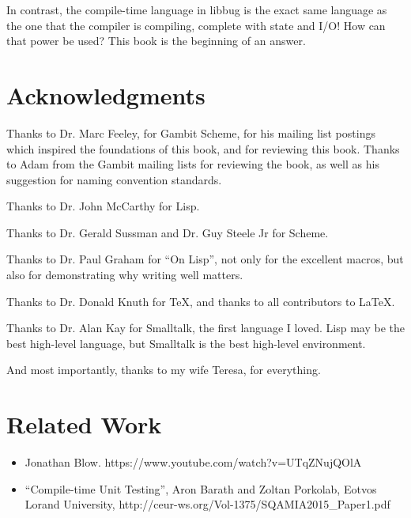  In contrast, the compile-time
 language in libbug is the exact same language as the one that the compiler
 is compiling, complete with state and I/O!  How can that power be used?
 This book is the beginning of an answer.

\chapter{Acknowledgments}

Thanks to Dr. Marc Feeley, for Gambit Scheme, for his mailing list postings
which inspired the foundations of this book, and for reviewing this
book.  Thanks to Adam from the Gambit mailing lists for reviewing the book,
as well as his suggestion for naming convention standards.

Thanks to Dr. John McCarthy for Lisp.

Thanks to Dr. Gerald Sussman and Dr. Guy Steele Jr for Scheme.

Thanks to Dr. Paul Graham for ``On Lisp'', not only for the excellent macros,
but also for demonstrating why writing well matters.

Thanks to Dr. Donald Knuth for \TeX, and thanks to all contributors to
\LaTeX.

Thanks to Dr. Alan Kay for Smalltalk, the first language I loved.  Lisp may be the best high-level language, but Smalltalk is the best high-level environment.

And most importantly, thanks to my wife Teresa, for everything.

\chapter{Related Work}
\begin{itemize}
        \item  Jonathan Blow. https://www.youtube.com/watch?v=UTqZNujQOlA
        \item  ``Compile-time Unit Testing'',
           Aron Barath and Zoltan Porkolab, Eotvos Lorand University, \newline
           http://ceur-ws.org/Vol-1375/SQAMIA2015\_Paper1.pdf
\end{itemize}

